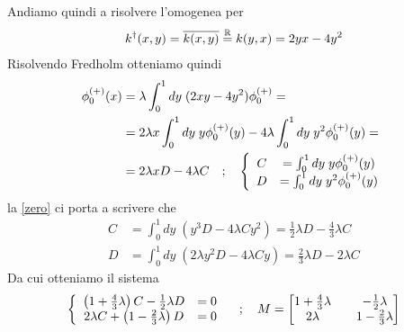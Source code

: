 \begin{enumerate}
	Andiamo quindi a risolvere l'omogenea per
	\begin{align}
		k^\dagger (x,y) = \overline{k(x,y)} \overset{\mathbb{R}}{=} k(y,x) = 2yx - 4y^2
	\end{align} 
	Risolvendo Fredholm otteniamo quindi
	\begin{align}
		\phi_0^{(+)}(x) &= \lambda \int_{0}^{1} dy \; (2xy-4y^2) \phi_0^{(+)} = \nonumber\\
		&=  2\lambda x\int_{0}^{1} dy \; y \phi_0^{(+)}(y) -4\lambda \int_{0}^{1} dy \;y^2 \phi_0^{(+)}(y) = \nonumber\\
		&= 2\lambda x D - 4 \lambda C \quad ; \quad \left\{ \begin{array}{cc} C &= \int_{0}^{1} dy \; y \phi_0^{(+)}(y)\\ D &= \int_{0}^{1} dy \;y^2 \phi_0^{(+)}(y) \end{array} \right. \label{zero}
	\end{align}
	la \ref{zero} ci porta a scrivere che
	\begin{align}
		C &= \int_{0}^{1} dy \; \left( y^3D - 4\lambda C y^2 \right) = \frac{1}{2} \lambda D - \frac{4}{3} \lambda C\\
		D &= \int_{0}^{1} dy \; \left( 2\lambda y^2D - 4\lambda C y \right) = \frac{2}{3} \lambda D - 2 \lambda C
	\end{align}
	Da cui otteniamo il sistema
	\begin{align}
		\left\{ \begin{array}{cc} \left(1 + \frac{4}{3} \lambda\right) C - \frac{1}{2} \lambda D &= 0\\ 2\lambda C + \left( 1 - \frac{2}{3}\lambda \right) D &=0 \end{array} \right. \quad ; \quad M = \begin{bmatrix}
			1 + \frac{4}{3} \lambda && - \frac{1}{2} \lambda\\
			2 \lambda && 1- \frac{2}{3} \lambda
		\end{bmatrix}
	\end{align}
	

\end{enumerate}
